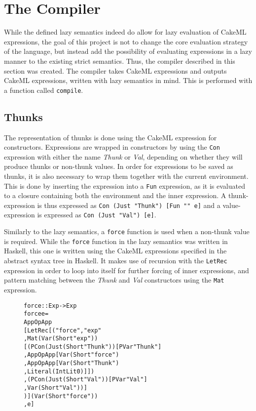 \chapter{The Compiler}

While the defined lazy semantics indeed do allow for lazy evaluation of CakeML
expressions, the goal of this project is not to change the core evaluation
strategy of the language, but instead add the possibility of evaluating
expressions in a lazy manner to the existing strict semantics.
Thus, the compiler described in this section was
created. The compiler takes CakeML expressions and outputs CakeML expressions,
written with lazy semantics in mind. This is performed with a function called
\texttt{compile}.

\section{Thunks}
The representation of thunks is done using the CakeML expression for
constructors. Expressions are wrapped in constructors by using the
\texttt{Con} expression with either the name
\textit{Thunk} or \textit{Val}, depending on whether they will produce thunks or
non-thunk values. In order for expressions to be saved as thunks, it is also
necessary to wrap them together with the current environment. This is done by
inserting the expression into a \texttt{Fun} expression, as it is evaluated to a
closure containing both the environment and the inner expression. A
thunk-expression is thus expressed as \texttt{Con (Just "Thunk") [Fun "" e]} and
a value-expression is expressed as \texttt{Con (Just "Val") [e]}.

Similarly to the lazy semantics, a \texttt{force} function is used when a
non-thunk value is required. While the \texttt{force} function in the lazy
semantics was written in Haskell, this one is written using the CakeML
expressions specified in the abstract syntax tree in Haskell. It makes use of
recursion with the \texttt{LetRec} expression in order to loop into itself for
further forcing of inner expressions, and pattern matching between the
\textit{Thunk} and \textit{Val} constructors using the \texttt{Mat} expression.

\begin{figure}[H]
\begin{alltt}
force :: Exp -> Exp
force e =
  App OpApp
    [LetRec [("force", "exp"
            , Mat (Var (Short "exp"))
              [(PCon (Just (Short "Thunk")) [PVar "Thunk"]
               , App OpApp [Var (Short "force")
                           , App OpApp [Var (Short "Thunk")
                                       , Literal (IntLit 0)]])
              ,(PCon (Just (Short "Val")) [PVar "Val"]
               , Var (Short "Val"))]
            )] (Var (Short "force"))
    , e]
\end{alltt}
\end{figure}

